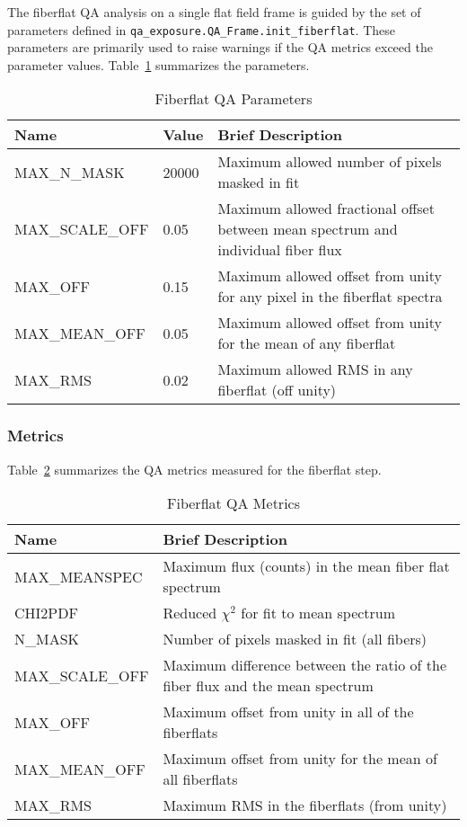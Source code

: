 \documentclass[12pt]{article}
\begin{document}
The fiberflat QA analysis on a single flat field frame 
is guided by the set of
parameters defined in {\tt qa\_exposure.QA\_Frame.init\_fiberflat}.
These parameters are primarily used 
to raise warnings if the QA metrics exceed the parameter values.
Table~\ref{tab:flat_param} summarizes the parameters.

\begin{table}[h]
\begin{center}
\caption{Fiberflat QA Parameters}
\label{tab:flat_param}
\begin{tabular}{p{3.5cm}p{1.2cm}p{8.3cm}}
\hline
{\bf Name} & {\bf Value} & {\bf Brief Description}\\
\hline
MAX\_N\_MASK    & 20000 & Maximum allowed number of pixels masked in fit \\
MAX\_SCALE\_OFF & 0.05  & Maximum allowed fractional offset between mean spectrum and individual fiber flux \\ 
MAX\_OFF        & 0.15  & Maximum allowed offset from unity for any pixel in the fiberflat spectra\\
MAX\_MEAN\_OFF  & 0.05  & Maximum allowed offset from unity for the mean of any fiberflat \\
MAX\_RMS        & 0.02  & Maximum allowed RMS in any fiberflat (off unity) \\
\hline
\end{tabular}
\end{center}
\end{table}



\subsubsection{Metrics}

Table~\ref{tab:flat_metrics} summarizes the QA metrics measured
for the fiberflat step.  

\begin{table}[h]
\begin{center}
\caption{Fiberflat QA Metrics}
\label{tab:flat_metrics}
\begin{tabular}{p{3.5cm}p{9.0cm}}
\hline
{\bf Name} & {\bf Brief Description}\\
\hline
MAX\_MEANSPEC   & Maximum flux (counts) in the mean fiber flat spectrum \\ 
CHI2PDF         & Reduced $\chi^2$ for fit to mean spectrum \\
N\_MASK         & Number of pixels masked in fit (all fibers) \\
MAX\_SCALE\_OFF & Maximum difference between the ratio of the fiber flux and 
  the mean spectrum \\
MAX\_OFF        & Maximum offset from unity in all of the fiberflats \\
MAX\_MEAN\_OFF  & Maximum offset from unity for the mean of all fiberflats \\
MAX\_RMS        & Maximum RMS in the fiberflats (from unity) \\
\hline
\end{tabular}
\end{center}
\end{table}
\end{document}
